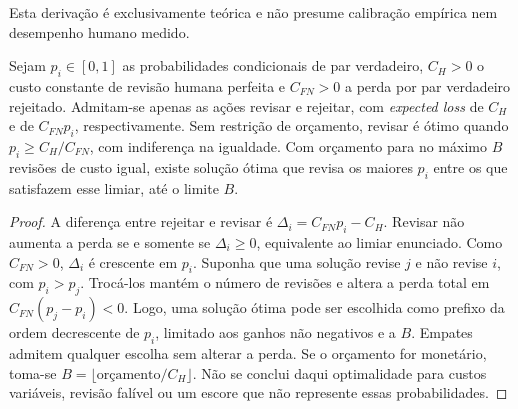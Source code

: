 Esta derivação é exclusivamente teórica e não presume calibração empírica nem desempenho humano medido.

\begin{proposition}
\label{prop:duas-acoes-orcamento}
Sejam $p_i\in[0,1]$ as probabilidades condicionais de par verdadeiro, $C_H>0$ o custo constante de revisão humana perfeita e $C_{FN}>0$ a perda por par verdadeiro rejeitado. Admitam-se apenas as ações revisar e rejeitar, com \textit{expected loss} de $C_H$ e de $C_{FN}p_i$, respectivamente. Sem restrição de orçamento, revisar é ótimo quando $p_i\geq C_H/C_{FN}$, com indiferença na igualdade. Com orçamento para no máximo $B$ revisões de custo igual, existe solução ótima que revisa os maiores $p_i$ entre os que satisfazem esse limiar, até o limite $B$.
\end{proposition}

\begin{proof}
A diferença entre rejeitar e revisar é $\Delta_i=C_{FN}p_i-C_H$. Revisar não aumenta a perda se e somente se $\Delta_i\geq0$, equivalente ao limiar enunciado. Como $C_{FN}>0$, $\Delta_i$ é crescente em $p_i$. Suponha que uma solução revise $j$ e não revise $i$, com $p_i>p_j$. Trocá-los mantém o número de revisões e altera a perda total em $C_{FN}(p_j-p_i)<0$. Logo, uma solução ótima pode ser escolhida como prefixo da ordem decrescente de $p_i$, limitado aos ganhos não negativos e a $B$. Empates admitem qualquer escolha sem alterar a perda. Se o orçamento for monetário, toma-se $B=\lfloor\text{orçamento}/C_H\rfloor$. Não se conclui daqui optimalidade para custos variáveis, revisão falível ou um escore que não represente essas probabilidades.
\end{proof}
